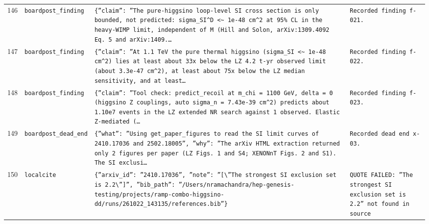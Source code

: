 \documentclass[11pt,a4paper]{article}
\begin{document}
\begin{longtable}{@{}p{}p{}p{}p{}@{}}
146 & \texttt{board}\newline\texttt{post\_\allowbreak{}finding} & \texttt{\{''claim'':\allowbreak{} ''The pure-higgsino loop-level SI cross section is only bounded,\allowbreak{} not predicted:\allowbreak{} sigma\_\allowbreak{}SI\textasciicircum{}\allowbreak{}D \textless{}\allowbreak{}\textasciitilde{}\allowbreak{} 1e-48 cm\textasciicircum{}\allowbreak{}2 at 95\% CL in the heavy-WIMP limit,\allowbreak{} independent of M (Hill and Solon,\allowbreak{} arXiv:\allowbreak{}1309.4092 Eq. 5 and arXiv:\allowbreak{}1409.\ldots{}\allowbreak{}} & \texttt{Recorded finding f-021.} \\
147 & \texttt{board}\newline\texttt{post\_\allowbreak{}finding} & \texttt{\{''claim'':\allowbreak{} ''At 1.1 TeV the pure thermal higgsino (sigma\_\allowbreak{}SI \textless{}\allowbreak{}\textasciitilde{}\allowbreak{} 1e-48 cm\textasciicircum{}\allowbreak{}2)\allowbreak{} lies at least about 33x below the LZ 4.2 t-yr observed limit (about 3.3e-47 cm\textasciicircum{}\allowbreak{}2)\allowbreak{},\allowbreak{} at least about 75x below the LZ median sensitivity,\allowbreak{} and at least\ldots{}\allowbreak{}} & \texttt{Recorded finding f-022.} \\
148 & \texttt{board}\newline\texttt{post\_\allowbreak{}finding} & \texttt{\{''claim'':\allowbreak{} ''Tool check:\allowbreak{} predict\_\allowbreak{}recoil at m\_\allowbreak{}chi =\allowbreak{} 1100 GeV,\allowbreak{} delta =\allowbreak{} 0 (higgsino Z couplings,\allowbreak{} auto sigma\_\allowbreak{}n =\allowbreak{} 7.43e-39 cm\textasciicircum{}\allowbreak{}2)\allowbreak{} predicts about 1.10e7 events in the LZ extended NR search against 1 observed. Elastic Z-mediated (\ldots{}\allowbreak{}} & \texttt{Recorded finding f-023.} \\
149 & \texttt{board}\newline\texttt{post\_\allowbreak{}dead\_\allowbreak{}end} & \texttt{\{''what'':\allowbreak{} ''Using get\_\allowbreak{}paper\_\allowbreak{}figures to read the SI limit curves of 2410.17036 and 2502.18005'',\allowbreak{} ''why'':\allowbreak{} ''The arXiv HTML extraction returned only 2 figures per paper (LZ Figs. 1 and S4;\allowbreak{} XENONnT Figs. 2 and S1)\allowbreak{}. The SI exclusi\ldots{}\allowbreak{}} & \texttt{Recorded dead end x-03.} \\
150 & \texttt{local}\newline\texttt{cite} & \texttt{\{''arxiv\_\allowbreak{}id'':\allowbreak{} ''2410.17036'',\allowbreak{} ''note'':\allowbreak{} ''[\textbackslash{}\allowbreak{}''The strongest SI exclusion set is 2.2\textbackslash{}\allowbreak{}'']\allowbreak{}'',\allowbreak{} ''bib\_\allowbreak{}path'':\allowbreak{} ''/\allowbreak{}Users/\allowbreak{}nramachandra/\allowbreak{}hep-genesis-testing/\allowbreak{}projects/\allowbreak{}ramp-combo-higgsino-dd/\allowbreak{}runs/\allowbreak{}261022\_\allowbreak{}143135/\allowbreak{}references.bib''\}\allowbreak{}} & \texttt{QUOTE FAILED:\allowbreak{} ''The strongest SI exclusion set is 2.2'' not found in source} \\

\end{longtable}
\end{document}
